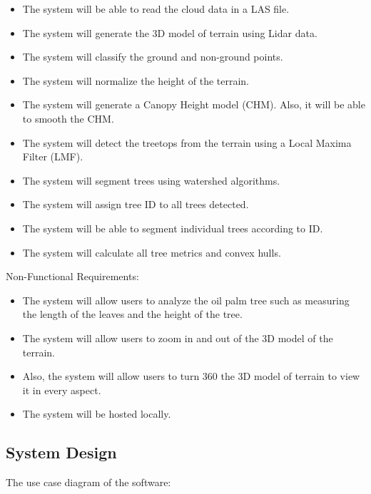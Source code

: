 \documentclass[a4paper, 12pt]{article}
\begin{document}
\begin{itemize}
    \item The system will be able to read the cloud data in a LAS file. \item The system will generate the 3D model of terrain using Lidar data. \item The system will classify the ground and non-ground points. \item The system will normalize the height of the terrain. \item The system will generate a Canopy Height model (CHM). Also, it will be able to smooth the CHM. \item The system will detect the treetops from the terrain using a Local Maxima Filter (LMF). \item The system will segment trees using watershed algorithms. \item The system will assign tree ID to all trees detected. \item The system will be able to segment individual trees according to ID. \item The system will calculate all tree metrics and convex hulls.
\end{itemize}

Non-Functional Requirements:

\begin{itemize}
    \item The system will allow users to analyze the oil palm tree such as measuring the length of the leaves and the height of the tree. \item The system will allow users to zoom in and out of the 3D model of the terrain. \item Also, the system will allow users to turn 360 the 3D model of terrain to view it in every aspect. \item The system will be hosted locally.
\end{itemize}

\subsection{System Design}

The use case diagram of the software:
\end{document}
